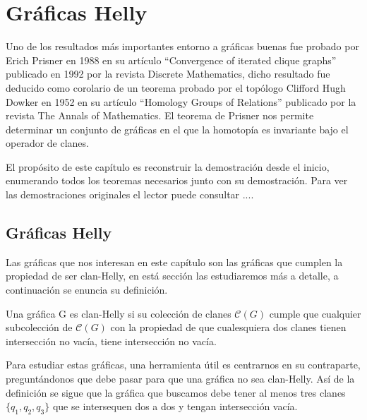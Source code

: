 \chapter{Gráficas Helly}
Uno de los resultados más importantes entorno a gráficas buenas fue probado por Erich Prisner en 1988 en su artículo ``Convergence of iterated clique graphs'' publicado en 1992 por la revista Discrete Mathematics, dicho resultado fue deducido como corolario de un teorema probado por el topólogo Clifford Hugh Dowker en 1952 en su artículo ``Homology Groups of Relations'' publicado por la revista The Annals of Mathematics.
El teorema de Prisner nos permite determinar un conjunto de gráficas en el que la homotopía es invariante bajo el operador de clanes.

El propósito de este capítulo es reconstruir la demostración desde el inicio, enumerando todos los teoremas necesarios junto con su demostración. Para ver las demostraciones originales el lector puede consultar ....

\section{Gráficas Helly}
Las gráficas que nos interesan en este capítulo son las gráficas que cumplen la propiedad de ser clan-Helly, en está sección las estudiaremos más a detalle, a continuación se enuncia su definición.
\begin{Defi}
Una gráfica G es clan-Helly si su colección de clanes $\mathcal{C}(G)$ cumple que cualquier subcolección de $\mathcal{C}(G)$ con la propiedad de que cualesquiera dos clanes tienen intersección no vacía, tiene intersección no vacía.  
\end{Defi}

Para estudiar estas gráficas, una herramienta útil es centrarnos en su contraparte, preguntándonos que debe pasar para que una gráfica no sea clan-Helly. Así de la definición se sigue que la gráfica que buscamos debe tener al menos tres clanes $\{q_1,q_2,q_3\}$ que se intersequen dos a dos y tengan intersección vacía.


